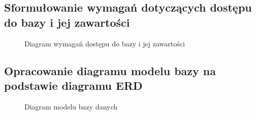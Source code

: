 \subsection{Sformułowanie wymagań dotyczących dostępu do bazy i jej zawartości}
\begin{figure}[H]
    \centering
    \caption{Diagram wymagań dostępu do bazy i jej zawartości}
\end{figure}
\subsection{Opracowanie diagramu modelu bazy na podstawie diagramu ERD}
\begin{figure}[H]
    \centering
    \caption{Diagram modelu bazy danych}
\end{figure}
